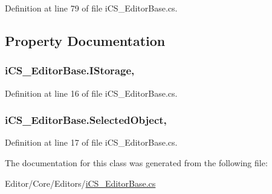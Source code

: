 Definition at line 79 of file i\+C\+S\+\_\+\+Editor\+Base.\+cs.



\subsection{Property Documentation}
\hypertarget{classi_c_s___editor_base_a7676e080cb35abb92a2eff4845fe36c2}{
\subsubsection[{I\+Storage}]{ i\+C\+S\+\_\+\+Editor\+Base.\+I\+Storage\hspace{0.3cm}{\ttfamily [get]}, {\ttfamily [set]}}}\label{classi_c_s___editor_base_a7676e080cb35abb92a2eff4845fe36c2}


Definition at line 16 of file i\+C\+S\+\_\+\+Editor\+Base.\+cs.

\hypertarget{classi_c_s___editor_base_ae9874d79373ff649f5baa63d7b25caad}{
\subsubsection[{Selected\+Object}]{ i\+C\+S\+\_\+\+Editor\+Base.\+Selected\+Object\hspace{0.3cm}{\ttfamily [get]}, {\ttfamily [set]}}}\label{classi_c_s___editor_base_ae9874d79373ff649f5baa63d7b25caad}


Definition at line 17 of file i\+C\+S\+\_\+\+Editor\+Base.\+cs.



The documentation for this class was generated from the following file\+:\begin{DoxyCompactItemize}
\item 
Editor/\+Core/\+Editors/\hyperlink{i_c_s___editor_base_8cs}{i\+C\+S\+\_\+\+Editor\+Base.\+cs}\end{DoxyCompactItemize}
